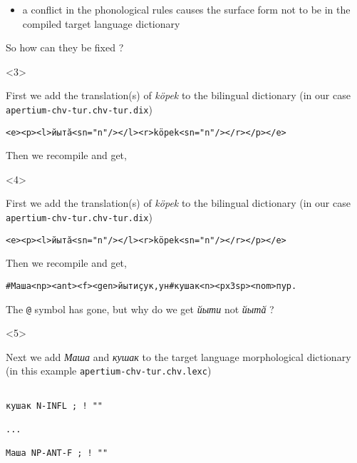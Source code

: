 \documentclass[10pt,xetex]{beamer} %
\begin{document}
\begin{frame}[fragile]
\begin{onlyenv}
\begin{itemize}
\begin{itemize}
    \item a conflict in the phonological rules causes the surface form not to be in the compiled target language 
      dictionary
  \end{itemize}
\end{itemize}

So how can they be fixed ? 


\end{onlyenv}

\begin{onlyenv}<3>

First we add the translation(s) of {\em köpek} to the bilingual dictionary (in our case {\tt apertium-chv-tur.chv-tur.dix})

\begin{alltt}
<e><p><l>йытӑ<s n="n"/></l><r>köpek<s n="n"/></r></p></e>
\end{alltt}

Then we recompile and get,

\end{onlyenv}

\begin{onlyenv}<4>

First we add the translation(s) of {\em köpek} to the bilingual dictionary (in our case {\tt apertium-chv-tur.chv-tur.dix})

\begin{alltt}
<e><p><l>йытӑ<s n="n"/></l><r>köpek<s n="n"/></r></p></e>
\end{alltt}

Then we recompile and get,

\begin{alltt}
{\smallermono \alert{\#}Маша<np><ant><f><gen> йыти ҫук, ун \alert{\#}кушак<n><px3sp><nom> пур. }
\end{alltt}

The {\tt @} symbol has gone, but why do we get {\em йыти} not {\em йытӑ} ?

\end{onlyenv}

\begin{onlyenv}<5>

Next we add {\em Маша} and {\em кушак} to the target language morphological dictionary (in 
this example {\tt apertium-chv-tur.chv.lexc})

\begin{verbatim}

кушак N-INFL ; ! ""

...

Маша NP-ANT-F ; ! ""


\end{verbatim}
\end{onlyenv}
\end{frame}
\end{document}
